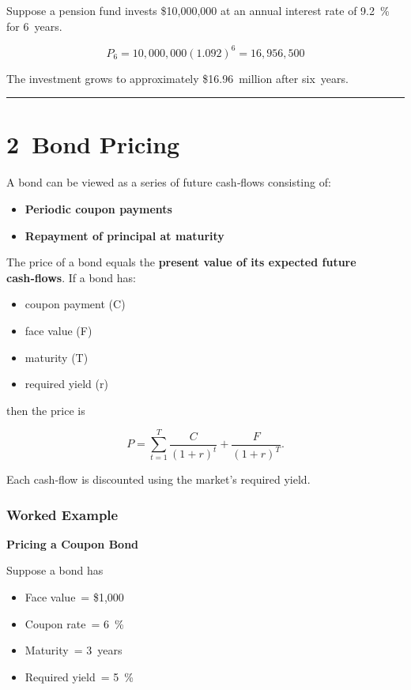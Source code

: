 \documentclass[
  letterpaper,
  DIV=11,
  numbers=noendperiod]{scrartcl}
\providecommand{\tightlist}{%
  \setlength{\itemsep}{0pt}\setlength{\parskip}{0pt}}
\begin{document}
Suppose a pension fund invests \$10,000,000 at an annual interest rate
of 9.2~\% for 6~years.

\[
P_6 = 10{,}000{,}000 (1.092)^6 = 16{,}956{,}500
\]

The investment grows to approximately \$16.96~million after six~years.

\begin{center}\rule{0.5\linewidth}{0.5pt}\end{center}

\section{2~Bond Pricing}\label{bond-pricing}

A bond can be viewed as a series of future cash‑flows consisting of:

\begin{itemize}
\tightlist
\item
  \textbf{Periodic coupon payments}
\item
  \textbf{Repayment of principal at maturity}
\end{itemize}

The price of a bond equals the \textbf{present value of its expected
future cash‑flows}. If a bond has:

\begin{itemize}
\tightlist
\item
  coupon payment (C)\\
\item
  face value (F)\\
\item
  maturity (T)\\
\item
  required yield (r)
\end{itemize}

then the price is

\[
P = \sum_{t=1}^{T} \frac{C}{(1+r)^t} + \frac{F}{(1+r)^T}.
\]

Each cash‑flow is discounted using the market's required yield.

\subsubsection{Worked Example}\label{worked-example-1}

\textbf{Pricing a Coupon Bond}

Suppose a bond has

\begin{itemize}
\tightlist
\item
  Face value~= \$1,000\\
\item
  Coupon rate~= 6~\%\\
\item
  Maturity~= 3~years\\
\item
  Required yield~= 5~\%
\end{itemize}
\end{document}
